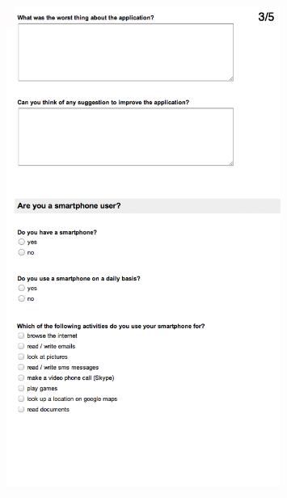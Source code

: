 \begin{figure}[htb]
  \centering
    \includegraphics[width=0.8\textwidth]{images/evalform2c}
\end{figure}

